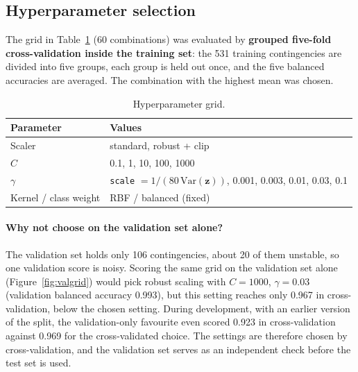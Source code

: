 \documentclass[11pt,a4paper]{article}
\newcommand{\code}[1]{\texttt{#1}}
\begin{document}
\subsection{Hyperparameter selection}
\label{sec:tuning}
The grid in Table~\ref{tab:grid} (60 combinations) was evaluated by \textbf{grouped five-fold cross-validation inside
the training set}: the 531 training contingencies are divided into five groups, each group is held out once, and
the five balanced accuracies are averaged. The combination with the highest mean was chosen.

\begin{table}[htbp]
\centering
\caption{Hyperparameter grid.}
\label{tab:grid}
\begin{tabular}{ll}
\toprule
Parameter & Values \\
\midrule
Scaler   & standard, robust + clip \\
$C$      & 0.1, 1, 10, 100, 1000 \\
$\gamma$ & \code{scale} $= 1/(80\,\mathrm{Var}(\mathbf{z}))$, 0.001, 0.003, 0.01, 0.03, 0.1 \\
Kernel / class weight & RBF / balanced (fixed) \\
\bottomrule
\end{tabular}
\end{table}

\paragraph{Why not choose on the validation set alone?} The validation set holds only 106 contingencies, about 20 of
them unstable, so one validation score is noisy. Scoring the same grid on the validation set alone
(Figure~\ref{fig:valgrid}) would pick robust scaling with $C = 1000$, $\gamma = 0.03$ (validation balanced accuracy
0.993), but this setting reaches only 0.967 in cross-validation, below the chosen setting. During development, with an
earlier version of the split, the validation-only favourite even scored 0.923 in cross-validation against 0.969 for
the cross-validated choice. The settings are therefore chosen by cross-validation, and the validation set serves as an
independent check before the test set is used.
\end{document}
